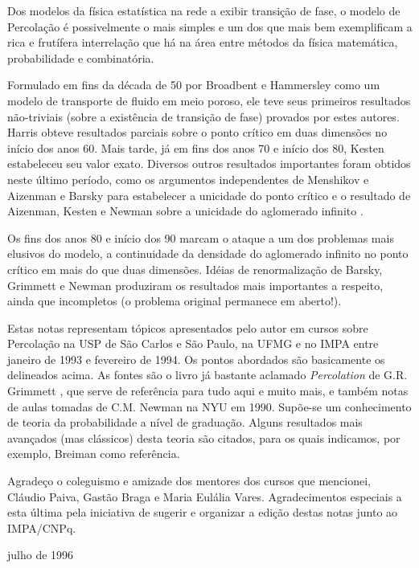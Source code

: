 Dos modelos da física estatística na rede a exibir transição de fase,
o modelo de Percolação é possivelmente o mais simples e um dos que
mais bem
exemplificam a rica e frutífera interrelação que há na área entre
métodos da física matemática, probabilidade e combinatória.

Formulado em fins da década de 50 por Broadbent e Hammersley \cite{kn:BH} como
um modelo de transporte de fluido em meio poroso, ele teve seus 
primeiros resultados não-triviais (sobre a existência de transição 
de fase) provados por estes autores. Harris \cite{kn:H} obteve resultados parciais
sobre o ponto crítico em duas dimensões no início dos anos 60. Mais 
tarde, já em fins dos anos 70 e início dos 80, Kesten \cite{kn:K1} 
estabeleceu seu valor exato. 
Diversos outros resultados importantes foram obtidos neste último 
período, como os argumentos independentes de Menshikov \cite{kn:M} 
e Aizenman e Barsky \cite{kn:AB} para estabelecer a unicidade do ponto crítico
e o resultado de Aizenman, Kesten e Newman sobre a unicidade do aglomerado infinito \cite{kn:AKN}.

Os fins dos anos 80 e início dos 90 marcam o ataque a um dos problemas mais 
elusivos do modelo, a continuidade da densidade do aglomerado infinito no 
ponto crítico em 
mais do que duas dimensões. Idéias de renormalização de Barsky, Grimmett e
Newman \cite{kn:BGN} produziram os resultados mais importantes a respeito, ainda que
incompletos (o problema original permanece em aberto!). 

\vspace{1cm}

Estas notas representam tópicos apresentados pelo autor em cursos
sobre Percolação na USP de São Carlos e São Paulo, na UFMG e no 
IMPA entre
janeiro de 1993 e fevereiro de 1994. Os pontos abordados são basicamente os
delineados acima.
As fontes são o livro já bastante 
aclamado {\em Percolation} 
de G.R. Grimmett \cite{kn:G}, que serve de referência para tudo aqui e muito mais,
e também notas de aulas tomadas de C.M. Newman na NYU em 1990. 
Supõe-se um conhecimento de teoria da probabilidade a nível de graduação. 
Alguns resultados mais avançados
(mas clássicos) desta teoria são citados, para os quais indicamos, por exemplo,
Breiman \cite{kn:B} como referência.

Agradeço o coleguismo e amizade dos mentores dos cursos que mencionei, 
Cláudio Paiva, Gastão Braga e Maria Eulália Vares.
Agradecimentos especiais a esta última pela iniciativa de sugerir 
e organizar a edição destas notas junto ao IMPA/CNPq.

\begin{flushright}
julho de 1996
\end{flushright}


